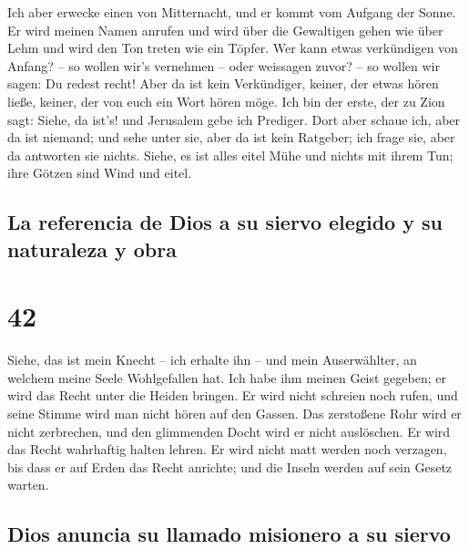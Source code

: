  Ich aber erwecke einen von Mitternacht, und er kommt vom
Aufgang der Sonne. Er wird meinen Namen anrufen und wird über die
Gewaltigen gehen wie über Lehm und wird den Ton treten wie ein Töpfer.
 Wer kann etwas verkündigen von Anfang? -- so wollen
wir's vernehmen -- oder weissagen zuvor? -- so wollen wir sagen: Du
redest recht! Aber da ist kein Verkündiger, keiner, der etwas hören
ließe, keiner, der von euch ein Wort hören möge.  Ich bin
der erste, der zu Zion sagt: Siehe, da ist's! und Jerusalem gebe ich
Prediger.  Dort aber schaue ich, aber da ist niemand; und
sehe unter sie, aber da ist kein Ratgeber; ich frage sie, aber da
antworten sie nichts.  Siehe, es ist alles eitel Mühe und
nichts mit ihrem Tun; ihre Götzen sind Wind und eitel.

\hypertarget{la-referencia-de-dios-a-su-siervo-elegido-y-su-naturaleza-y-obra}{%
\subsection{La referencia de Dios a su siervo elegido y su naturaleza y
obra}\label{la-referencia-de-dios-a-su-siervo-elegido-y-su-naturaleza-y-obra}}

\hypertarget{section-41}{%
\section{42}\label{section-41}}

 Siehe, das ist mein Knecht -- ich erhalte ihn -- und mein
Auserwählter, an welchem meine Seele Wohlgefallen hat. Ich habe ihm
meinen Geist gegeben; er wird das Recht unter die Heiden bringen.
 Er wird nicht schreien noch rufen, und seine Stimme wird
man nicht hören auf den Gassen.  Das zerstoßene Rohr wird
er nicht zerbrechen, und den glimmenden Docht wird er nicht auslöschen.
Er wird das Recht wahrhaftig halten lehren.  Er wird nicht
matt werden noch verzagen, bis dass er auf Erden das Recht anrichte; und
die Inseln werden auf sein Gesetz warten.

\hypertarget{dios-anuncia-su-llamado-misionero-a-su-siervo}{%
\subsection{Dios anuncia su llamado misionero a su
siervo}\label{dios-anuncia-su-llamado-misionero-a-su-siervo}}

